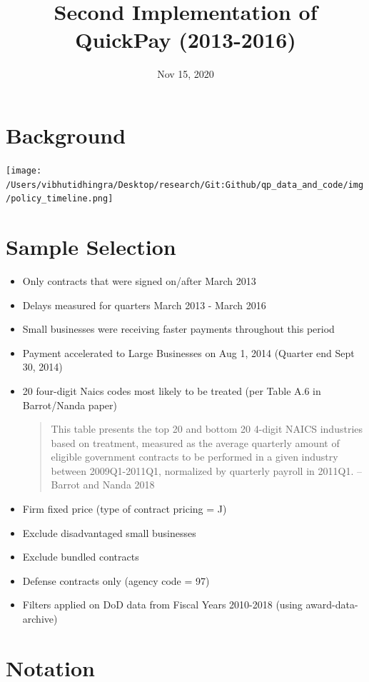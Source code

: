 \documentclass[
]{article}
\title{Second Implementation of QuickPay (2013-2016)}
\author{}
\date{\vspace{-2.5em}Nov 15, 2020}
\begin{document}
\maketitle

\hypertarget{background}{%
\section{Background}\label{background}}

\texttt{[image: /Users/vibhutidhingra/Desktop/research/Git:Github/qp\_data\_and\_code/img/policy\_timeline.png]}

\hypertarget{sample-selection}{%
\section{Sample Selection}\label{sample-selection}}

\begin{itemize}
\item
  Only contracts that were signed on/after March 2013
\item
  Delays measured for quarters March 2013 - March 2016
\item
  Small businesses were receiving faster payments throughout this period
\item
  Payment accelerated to Large Businesses on Aug 1, 2014 (Quarter end
  Sept 30, 2014)
\item
  20 four-digit Naics codes most likely to be treated (per Table A.6 in
  Barrot/Nanda paper)

  \begin{quote}
  This table presents the top 20 and bottom 20 4-digit NAICS industries
  based on treatment, measured as the average quarterly amount of
  eligible government contracts to be performed in a given industry
  between 2009Q1-2011Q1, normalized by quarterly payroll in 2011Q1. --
  Barrot and Nanda 2018
  \end{quote}
\item
  Firm fixed price (type of contract pricing = J)
\item
  Exclude disadvantaged small businesses
\item
  Exclude bundled contracts
\item
  Defense contracts only (agency code = 97)
\item
  Filters applied on DoD data from Fiscal Years 2010-2018 (using
  award-data-archive)
\end{itemize}

\hypertarget{notation}{%
\section{Notation}\label{notation}}
\end{document}
